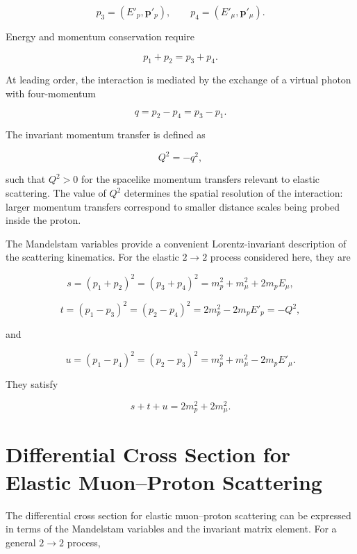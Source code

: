 \begin{equation}
    p_3=(E'_p,\mathbf{p}'_p),
    \qquad
    p_4=(E'_\mu,\mathbf{p}'_\mu).
\end{equation}

Energy and momentum conservation require

\begin{equation}
    p_1+p_2=p_3+p_4.
\end{equation}

At leading order, the interaction is mediated by the exchange of a virtual photon with four-momentum

\begin{equation}
    q=p_2-p_4=p_3-p_1 .
\end{equation}

The invariant momentum transfer is defined as

\begin{equation}
    Q^2=-q^2,
\end{equation}

such that \(Q^2>0\) for the spacelike momentum transfers relevant to elastic scattering. The value of \(Q^2\) determines the spatial resolution of the interaction: larger momentum transfers correspond to smaller distance scales being probed inside the proton.

The Mandelstam variables provide a convenient Lorentz-invariant description of the scattering kinematics. For the elastic \(2\rightarrow2\) process considered here, they are

\[
s=(p_1+p_2)^2
=(p_3+p_4)^2
=m_p^2+m_\mu^2+2m_pE_\mu,
\]

\begin{equation}
    t=(p_1-p_3)^2
    =(p_2-p_4)^2
    =2m_p^2-2m_pE'_p
    =-Q^2,
    \label{eq:t}
\end{equation}

and

\[
u=(p_1-p_4)^2
=(p_2-p_3)^2
=m_p^2+m_\mu^2-2m_pE'_\mu.
\]

They satisfy

\[
s+t+u=2m_p^2+2m_\mu^2.
\]


\section{Differential Cross Section for Elastic Muon--Proton Scattering}

The differential cross section for elastic muon--proton scattering can be expressed in terms of the Mandelstam variables and the invariant matrix element. For a general \(2\rightarrow2\) process,

